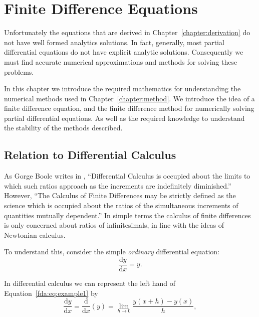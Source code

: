 \documentclass[../main.tex]{subfiles}
\begin{document}
  \chapter{Finite Difference Equations}\label{chapter:fdes}

  Unfortunately the equations that are derived in Chapter~\ref{chapter:derivation} do not have well formed analytics solutions. In fact, generally, most partial differential equations do not have explicit analytic solutions. Consequently we must find accurate numerical approximations and methods for solving these problems.

  In this chapter we introduce the required mathematics for understanding the numerical methods used in Chapter~\ref{chapter:method}. We introduce the idea of a finite difference equation, and the finite difference method for numerically solving partial differential equations. As well as the required knowledge to understand the stability of the methods described.

  \section{Relation to Differential Calculus}\label{sec:fdes:intro}
  As Gorge Boole writes in \cite{boole1880}, ``Differential Calculus is occupied about the limits to which such ratios approach as the increments are indefinitely diminished.'' However, ``The Calculus of Finite Differences may be strictly defined as the science which is occupied about the ratios of the simultaneous increments of quantities mutually dependent.'' In simple terms the calculus of finite differences is only concerned about ratios of infinitesimals, in line with the ideas of Newtonian calculus. \par

  To understand this, consider the simple \emph{ordinary} differential equation: \\

  \begin{equation}\label{fda:eq:example1}
    \frac{\mathrm{d}y}{\mathrm{d}x} = y.
  \end{equation}

  In differential calculus we can represent the left hand of Equation~\ref{fda:eq:example1} by \\

  \begin{equation}
    \frac{\mathrm{d}y}{\mathrm{d}x} = \frac{\mathrm{d}}{\mathrm{d}x}(y) = \lim_{h \to 0} \frac{y(x+h) - y(x)}{h},
  \end{equation}
\end{document}
